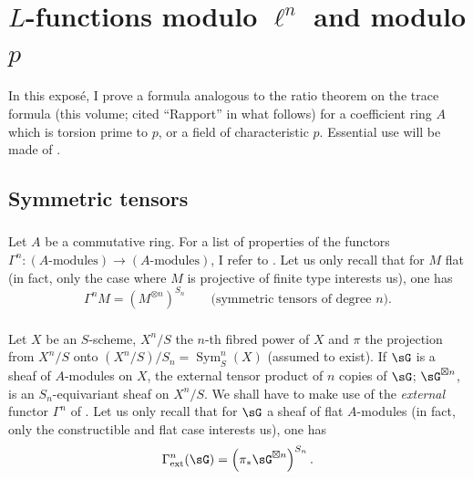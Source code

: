 
\chapter{\texorpdfstring{$L$}{L}-functions modulo \texorpdfstring{$\ell^n$}{l n} and modulo \texorpdfstring{$p$}{p}}\label{III}

In this expos\'e, I prove a formula analogous to the ratio theorem on
the trace formula (this volume; cited ``Rapport'' in what follows) for a
coefficient ring $A$ which is torsion prime to $p$, or a field of
characteristic $p$. Essential use will be made of \cite[XVII 5.5]{sga4}.










\section{Symmetric tensors}\label{III:1}




\subsection{}\label{III:1-1}

Let $A$ be a commutative ring. For a list of properties of the functors
$\Gamma^n:(\text{$A$-modules})\to (\text{$A$-modules})$, I refer to
\cite[XVII 5.5.1 et 2]{sga4}. Let us only recall that for $M$ flat (in fact, only
the case where $M$ is projective of finite type interests us), one has
\[
  \Gamma^n M = \left(M^{\otimes n}\right)^{S_n} \qquad \text{(symmetric tensors of degree $n$).}
\]




\subsection{}\label{III:1-2}

Let $X$ be an $S$-scheme, $X^n/S$ the $n$-th fibred power of $X$ and
$\pi$ the projection from $X^n/S$ onto $(X^n/S)/S_n=\operatorname{Sym}_S^n(X)$
(assumed to exist). If $\sG$ is a sheaf of $A$-modules on $X$, the
external tensor product of $n$ copies of $\sG$; $\sG^{\boxtimes n}$, is an
$S_n$-equivariant sheaf on $X^n/S$. We shall have to make use of the
\emph{external} functor $\Gamma^n$ of \cite[XVII 5.5.7 \`a 9]{sga4}. Let us only
recall that for $\sG$ a sheaf of flat $A$-modules (in fact, only the
constructible and flat case interests us), one has
\[
  \Gamma_\text{ext}^n(\sG) = \left(\pi_*\sG^{\boxtimes n}\right)^{S_n} \text{.}
\]




